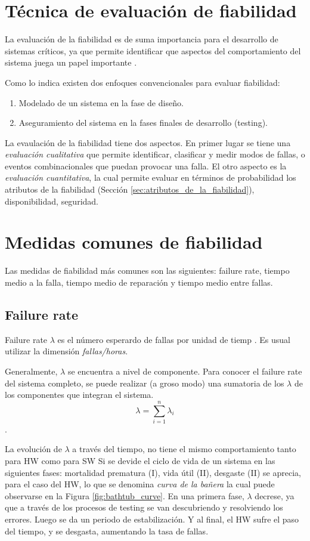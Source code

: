 \section{Técnica de evaluación de fiabilidad}
La evaluación de la fiabilidad es de suma importancia para el desarrollo de sistemas críticos, ya
que permite identificar que aspectos del comportamiento del sistema juega un papel importante
\citep{FTDesign}.

Como lo indica \cite{FTDesign} existen dos enfoques convencionales para evaluar fiabilidad:
\begin{enumerate}
 \item Modelado de un sistema en la fase de diseño.
 \item Aseguramiento del sistema en la fases finales de desarrollo (testing).
\end{enumerate}

La evaulación de la fiabilidad tiene dos aspectos. En primer lugar se tiene una \textit{evaluación
cualitativa} que permite identificar, clasificar y medir modos de fallas, o eventos combinacionales
que puedan provocar una falla. El otro aspecto es la \textit{evaluación cuantitativa}, la cual
permite evaluar en términos de probabilidad los atributos de la fiabilidad
(Sección \ref{sec:atributos_de_la_fiabilidad}), disponibilidad, seguridad.

\section{Medidas comunes de fiabilidad}
Las medidas de fiabilidad más comunes son las siguientes: failure rate, tiempo medio a la falla,
tiempo medio de reparación y tiempo medio entre fallas.

\subsection{Failure rate}
Failure rate $\lambda$ es el número esperardo de fallas por unidad de tiemp \citep{FTDesign}. Es
usual utilizar la dimensión \textit{fallas/horas}.

Generalmente, $\lambda$ se encuentra a nivel de componente. Para conocer el failure rate del
sistema completo, se puede realizar (a groso modo) una sumatoria de los $\lambda$ de los
componentes que integran el sistema. $$\lambda=\sum_{i=1}^{n} \lambda_i$$.

La evolución de $\lambda$ a través del tiempo, no tiene el mismo comportamiento tanto para \ac{HW} como para \ac{SW}
Si se devide el ciclo de vida de un sistema en las siguientes fases: mortalidad prematura (I), vida útil (II), desgaste (II) \citep{FTDesign}
se aprecia, para el caso del \ac{HW}, lo que se denomina \textit{curva de la bañera} la cual puede observarse en la Figura \ref{fig:bathtub_curve}.
En una primera fase, $\lambda$ decrese, ya que a través de los procesos de testing se van descubriendo y resolviendo los errores. Luego se da un periodo de estabilización.
Y al final, el \ac{HW} sufre el paso del tiempo, y se desgasta, aumentando la tasa de fallas.

